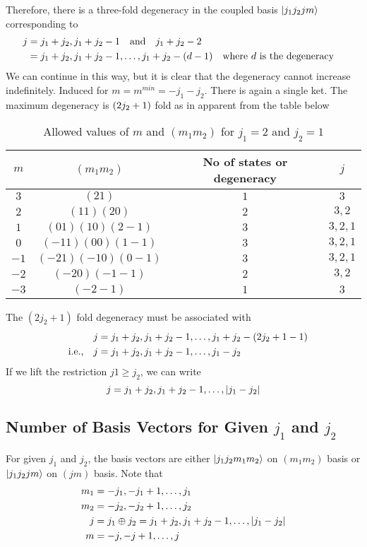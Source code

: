 Therefore, there is a three-fold degeneracy in the coupled basis $\ket{j_1 j_2 j m}$ corresponding to 
\begin{align*}
j &= j_1 + j_2,  j_1+j_2 - 1 \qq{and} j_1 + j_2 - 2 \\
&=  j_1 + j_2,  j_1+j_2 - 1, \ldots, j_1+j_2 - (d - 1) \qq{where $d$ is the degeneracy}
\end{align*}
We can continue in this way, but it is clear that the degeneracy cannot increase indefinitely. Induced for $m=m^{min} = -j_1 - j_2$. There is again a single ket. The maximum degeneracy is $\qty(2 j _2 + 1)$ fold as in apparent from the table below

\begin{table}
	\centering
	\begin{tabular}{c|c|c|c}
		$m$ & $(m_1 m_2)$ & No of states or degeneracy & $j$ \\
		\hline
		$3$ & $(21)$ & $1$ & $3$ \\
		$2$ & $(11)(20)$ & $2$ & $3,2$ \\
		$1$ & $(01)(10)(2-1)$ & $3$ & $3,2,1$ \\
		$0$ & $(-1 1)(0 0) (1 -1)$ & $3$ & $3,2,1$ \\
		$-1$ & $(-2 1)(-1 0)(0 -1)$ & $3$ & $3,2,1$ \\
		$-2$ & $(-2 0)(-1 -1)$ & $2$ & $3,2$ \\
		$-3$ & $(-2-1)$ & $1$ & $3$
	\end{tabular}
\caption{Allowed values of $m$ and $(m_1 m_2)$ for $j_1=2$ and $j_2=1$}
\end{table}

The $(2 j_2 + 1)$ fold degeneracy must be associated with 
\begin{align*}
j&=j_1 + j_2, j_1 + j_2 - 1, \ldots, j_1 + j_2 - (2 j_2 + 1 - 1) \\
\qq{i.e.,} j&= j_1 + j_2, j_1 + j_2 - 1, \ldots, j_1-j_2
\end{align*}
If we lift the restriction $j1 \geq j_2$, we can write
\begin{equation}
\label{chapter19-eqn9}
j = j_1 + j_2, j_1 + j_2 - 1, \ldots, \abs{j_1-j_2}
\end{equation}


\subsection{Number of Basis Vectors for Given \texorpdfstring{$j_1$}{PDFstring} and \texorpdfstring{$j_2$}{PDFstring}}
For given $j_1$ and $j_2$, the basis vectors are either $\ket{j_1 j_2 m_1 m_2}$ on $(m_1 m_2)$ basis or $\ket{j_1 j_2 j m}$ on $(j m)$ basis. Note that
\begin{align*}
m_1 &= -j_1, -j_1 + 1, \ldots, j_1\\
m_2 &= -j_2, -j_2 + 1, \ldots, j_2\\
j &= j_1 \oplus j_2 = j_1 + j_2, j_1 + j_2 - 1, \ldots, \abs{j_1 - j_2}\\
m &= -j, -j + 1, \ldots, j
\end{align*} 

